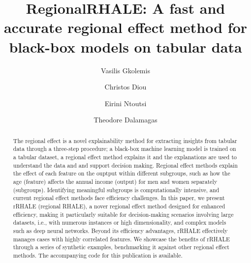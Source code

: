 \documentclass[
twocolumn,
]{ceurart}
\begin{document}


\title{RegionalRHALE: A fast and accurate regional effect method for black-box models on tabular data}

\author[1,2]{Vasilis Gkolemis}
\address[1]{Harokopio University of Athens}
\address[2]{ATHENA Research Center}
\author[1]{Christos Diou}
\author[3]{Eirini Ntoutsi}
\address[3]{University of the Bundeswehr Munich}
\author[2]{Theodore Dalamagas}


\begin{abstract}
  The regional effect is a novel explainability method for extracting insights from tabular data through a three-step procedure; a black-box machine learning model is trained on a tabular dataset, a regional effect method explains it and the explanations are used to understand the data and and support decision making.
  Regional effect methods explain the effect of each feature on the ouptput within different subgroups, such as how the age (feature) affects the annual income (output) for men and women separately (subgroups). Identifying meaningful subgroups is computationally intensive, and current regional effect methods face efficiency challenges.
In this paper, we present rRHALE (regional RHALE), a nover regional effect method designed for enhanced efficiency, making it particularly suitable for decision-making scenarios involving large datasets, i.e., with numerous instances or high dimensionality, and complex models such as deep neural networks. Beyond its efficiency advantages, rRHALE effectively manages cases with highly correlated features. We showcase the benefits of rRHALE through a series of synthetic examples, benchmarking it against other regional effect methods. The accompanying code for this publication is available.
\end{abstract}
\end{document}
